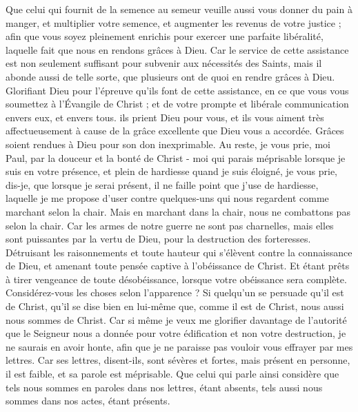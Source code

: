 \begin{multicols}{2}
Que celui qui fournit de la semence au semeur veuille aussi vous donner du pain à manger, et multiplier votre semence, et augmenter les revenus de votre justice ;
afin que vous soyez pleinement enrichis pour exercer une parfaite libéralité, laquelle fait que nous en rendons grâces à Dieu.
Car le service de cette assistance est non seulement suffisant pour subvenir aux nécessités des Saints, mais il abonde aussi de telle sorte, que plusieurs ont de quoi en rendre grâces à Dieu.
Glorifiant Dieu pour l’épreuve qu’ils font de cette assistance, en ce que vous vous soumettez à l’Évangile de Christ ; et de votre prompte et libérale communication envers eux, et envers tous.
ils prient Dieu pour vous, et ils vous aiment très affectueusement à cause de la grâce excellente que Dieu vous a accordée.
Grâces soient rendues à Dieu pour son don inexprimable.
\VerseOne{}Au reste, je vous prie, moi Paul, par la douceur et la bonté de Christ - moi qui parais méprisable lorsque je suis en votre présence, et plein de hardiesse quand je suis éloigné,
je vous prie, dis-je, que lorsque je serai présent, il ne faille point que j'use de hardiesse, laquelle je me propose d’user contre quelques-uns qui nous regardent comme marchant selon la chair.
Mais en marchant dans la chair, nous ne combattons pas selon la chair.
Car les armes de notre guerre ne sont pas charnelles, mais elles sont puissantes par la vertu de Dieu, pour la destruction des forteresses.
Détruisant les raisonnements et toute hauteur qui s'élèvent contre la connaissance de Dieu, et amenant toute pensée captive à l'obéissance de Christ.
Et étant prêts à tirer vengeance de toute désobéissance, lorsque votre obéissance sera complète.
Considérez-vous les choses selon l'apparence ? Si quelqu'un se persuade qu’il est de Christ, qu'il se dise bien en lui-même que, comme il est de Christ, nous aussi nous sommes de Christ.
Car si même je veux me glorifier davantage de l’autorité que le Seigneur nous a donnée pour votre édification et non votre destruction, je ne saurais en avoir honte,
afin que je ne paraisse pas vouloir vous effrayer par mes lettres.
Car ses lettres, disent-ils, sont sévères et fortes, mais présent en personne, il est faible, et sa parole est méprisable.
Que celui qui parle ainsi considère que tels nous sommes en paroles dans nos lettres, étant absents, tels aussi nous sommes dans nos actes, étant présents.

\end{multicols}
